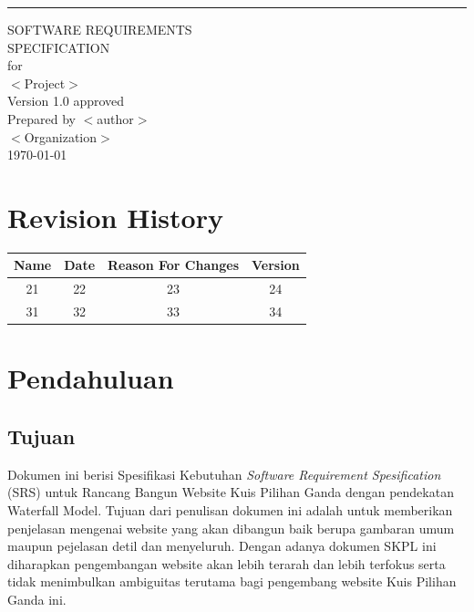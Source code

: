 \documentclass{scrreprt}
\date{}
\def\myversion{1.0 }
\begin{document}
\begin{flushright}
    \rule{16cm}{5pt}\vskip1cm
    \begin{bfseries}
        \Huge{SOFTWARE REQUIREMENTS\\ SPECIFICATION}\\
        \vspace{1.9cm}
        for\\
        \vspace{1.9cm}
        $<$Project$>$\\
        \vspace{1.9cm}
        \LARGE{Version \myversion approved}\\
        \vspace{1.9cm}
        Prepared by $<$author$>$\\
        \vspace{1.9cm}
        $<$Organization$>$\\
        \vspace{1.9cm}
        \today\\
    \end{bfseries}
\end{flushright}

\tableofcontents


\chapter*{Revision History}

\begin{center}
    \begin{tabular}{|c|c|c|c|}
        \hline
	    Name & Date & Reason For Changes & Version\\
        \hline
	    21 & 22 & 23 & 24\\
        \hline
	    31 & 32 & 33 & 34\\
        \hline
    \end{tabular}
\end{center}

\chapter{Pendahuluan}

\section{Tujuan}
Dokumen ini berisi Spesifikasi Kebutuhan \emph{Software Requirement Spesification} (SRS) untuk Rancang Bangun Website Kuis Pilihan Ganda dengan pendekatan Waterfall Model. Tujuan dari penulisan dokumen ini adalah untuk memberikan penjelasan mengenai website yang akan dibangun baik berupa gambaran umum maupun pejelasan detil dan menyeluruh.
Dengan adanya dokumen SKPL ini diharapkan pengembangan website akan lebih terarah dan lebih terfokus serta tidak menimbulkan ambiguitas terutama bagi pengembang website Kuis Pilihan Ganda ini.
\end{document}
